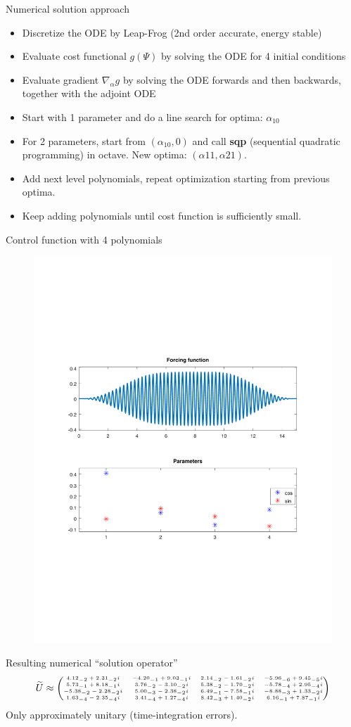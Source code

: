 \documentclass{beamer}
\begin{document}
\begin{frame}{Numerical solution approach}
  \begin{itemize}
    \item Discretize the ODE by Leap-Frog (2nd order accurate, energy
      stable)
    \item Evaluate cost functional $g(\Psi)$ by solving the ODE for 4 initial conditions
    \item Evaluate gradient $\nabla_\alpha g$ by solving the ODE
      forwards and then backwards, together with the adjoint ODE
    \item Start with 1 parameter and do a line search for optima: $\alpha_{10}$
    \item For 2 parameters, start from $(\alpha_{10},0)$ and call {\bf
      sqp} (sequential quadratic programming) in octave. New optima: $(\alpha{11},\alpha{21})$.
    \item Add next level polynomials, repeat optimization starting
      from previous optima.
    \item Keep adding polynomials until cost function is sufficiently small.      
  \end{itemize}
\end{frame}

\begin{frame}{Control function with 4 polynomials}
  \begin{figure}
    \includegraphics[width=0.45\linewidth]{forcing.pdf}
  \end{figure}
  Resulting numerical ``solution operator''
  \[\tiny
  \widetilde{U} \approx \begin{pmatrix}
4.12_{-2} + 2.31_{-2}i  & -4.20_{-1} + 9.03_{-1}i  & 2.14_{-2} -
1.61_{-2}i  & -5.96_{-6} + 9.45_{-5}i\\
%
   5.73_{-1} + 8.18_{-1}i &  3.76_{-2} - 3.10_{-2}i &  5.38_{-2} -
   1.70_{-2}i  & -5.78_{-4} + 2.95_{-4}i\\
  -5.38_{-2} - 2.28_{-2}i &  5.00_{-3} - 2.38_{-2}i &  6.49_{-1} -
  7.58_{-1}i  & -8.88_{-3} + 1.33_{-2}i \\
   1.63_{-4} - 2.35_{-4}i  & 3.41_{-4} + 1.27_{-4}i &  8.42_{-3} +
   1.40_{-2}i  &  6.16_{-1} + 7.87_{-1}i
  \end{pmatrix}
  \]
  Only approximately unitary (time-integration errors).
\end{frame}
\end{document}
